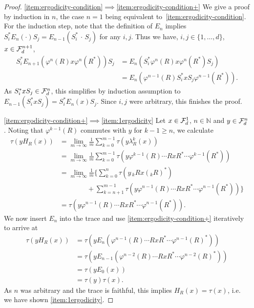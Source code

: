 \documentclass[12pt,a4paper]{amsart}
\numberwithin{equation}{section}
\theoremstyle{remark}
\newcommand{\Nl}{\mathbb{N}}
\newcommand{\la}{\lambda}
\begin{document}
	
\begin{proof}
	\ref{item:ergodicity-condition}$\implies$\ref{item:ergodicity-condition+} We give a proof by induction in $n$, the case $n=1$ being equivalent to~\ref{item:ergodicity-condition}. For the induction step, note that the definition of $E_n$ implies $S_i^*E_n(\cdot)S_j=E_{n-1}(S_i^*\,\cdot\,S_j)$ for any $i,j$. Thus we have, $i,j\in\{1,\ldots,d\}$, $x\in\mathcal{F}_d^{n+1}$,
	\begin{align*}
		S_i^*E_{n+1}(\varphi^n(R)x\varphi^n(R^*))S_j
		&=
		E_{n}(S_i^*\varphi^n(R)x\varphi^n(R^*)S_j)
		\\
		&=
		E_{n}(\varphi^{n-1}(R)S_i^*xS_j\varphi^{n-1}(R^*))
		.
	\end{align*}
	As $S_i^*xS_j\in\mathcal{F}_d^n$, this simplifies by induction assumption to $E_{n-1}(S_i^*xS_j)=S_i^*E_n(x)S_j$. Since $i,j$ were arbitrary, this finishes the proof.
	
	\ref{item:ergodicity-condition+}$\implies$\ref{item:1ergodicity} Let $x\in\mathcal{F}_d^1$, $n\in\Nl$ and $y\in\mathcal{F}_d^n$. Noting that $\varphi^{k-1}(R)$ commutes with $y$ for $k-1\geq n$, we calculate
    \begin{align}
        \nonumber
        \tau(yH_R(x))
        &=
        \lim_{m\to\infty}\frac{1}{m}\sum_{k=0}^{m-1}\tau(y\la^k_R(x))
        \\
        \nonumber
        &=
        \lim_{m\to\infty}\frac{1}{m}\sum_{k=0}^{m-1}\tau(y\varphi^{k-1}(R)\cdots RxR^*\cdots\varphi^{k-1}(R^*))
        \\
        \nonumber
        &=
        \lim_{m\to\infty}\frac{1}{m}\bigg\{
        \sum_{k=0}^{n}\tau(y\,{}_kRx({}_kR)^*)
        \\
        &\qquad\qquad\!+
        \sum_{k=n+1}^{m-1}\tau(y\varphi^{n-1}(R)\cdots RxR^*\cdots\varphi^{n-1}(R^*))
        \bigg\}
        \nonumber
        \\
        &=
        \tau(y\varphi^{n-1}(R)\cdots RxR^*\cdots\varphi^{n-1}(R^*))
        .
        \label{eq:ergodic-calculcation}
    \end{align}
    We now insert $E_n$ into the trace and use \ref{item:ergodicity-condition+} iteratively to arrive at 
    \begin{align*}
     \tau(yH_R(x))
     &=
     \tau(yE_n(\varphi^{n-1}(R)\cdots RxR^*\cdots\varphi^{n-1}(R)^*))
     \\
     &=
     \tau(yE_{n-1}(\varphi^{n-2}(R)\cdots RxR^*\cdots\varphi^{n-2}(R)^*))
     \\
     &=
     \tau(yE_{0}(x))
     \\
     &=
     \tau(y)\tau(x)
     .
    \end{align*}
	As $n$ was arbitrary and the trace is faithful, this implies $H_R(x)=\tau(x)$, i.e. we have shown \ref{item:1ergodicity}.
	

\end{proof}
\end{document}
